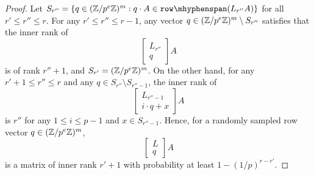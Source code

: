 \begin{proof}
Let $S_{r''} = \{q \in (\Z / p^e \Z)^m : q\cdot A \in \rowspan(L_{r''} A) \}$ for all $r' \leq r'' \leq r$.
For any $r' \leq r'' \leq r - 1$, any vector $q \in (\mathbb{Z} / p^e \mathbb{Z})^m \setminus S_{r''}$ satisfies that the inner rank of 
\[\begin{bmatrix}L_{r''} \\ q\end{bmatrix} A\] is of rank $r'' + 1$,
and $S_{r'} = (\mathbb{Z} / p^e \mathbb{Z})^m$. 
On the other hand, for any $r'  + 1\leq r'' \leq r$ and any $q \in S_{r''} \setminus S_{r'' - 1}$, the inner rank of 
\[\begin{bmatrix}L_{r'' - 1} \\ i\cdot q + x\end{bmatrix}A\]
is $r''$ for any $1 \leq i \leq p - 1$ and $x \in S_{r'' - 1}$. 
Hence, for a randomly sampled row vector $q \in (\mathbb{Z} / p^e \mathbb{Z})^m$, 
\[\begin{bmatrix}L \\ q\end{bmatrix}A\] is a matrix of inner rank $r' + 1$ with probability at least $1 - (1 / p)^{r - r'}$. 
\end{proof}

